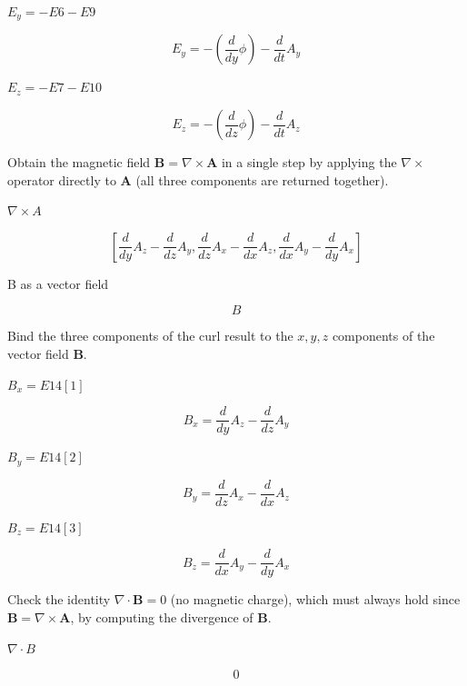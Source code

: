 \documentclass[dvipdfmx]{article}
\begin{document}
$E_y = -E6 - E9$

\begin{equation}
  E_y = -\left(\frac{d}{d y} \phi\right)-\frac{d}{d t} A_{y}
  \label{eq:E12}
\end{equation}

$E_z = -E7 - E10$

\begin{equation}
  E_z = -\left(\frac{d}{d z} \phi\right)-\frac{d}{d t} A_{z}
  \label{eq:E13}
\end{equation}

Obtain the magnetic field $\mathbf B=\nabla\times\mathbf A$ in a single step by applying the $\nabla\times$ operator directly to $\mathbf A$ (all three components are returned together).

$\nabla \times A$

\begin{equation}
  \left[ \frac{d}{d y} A_{z}-\frac{d}{d z} A_{y} , \frac{d}{d z} A_{x}-\frac{d}{d x} A_{z} , \frac{d}{d x} A_{y}-\frac{d}{d y} A_{x} \right]
  \label{eq:E14}
\end{equation}

B as a vector field

\[
  B
\]

Bind the three components of the curl result to the $x,y,z$ components of the vector field $\mathbf B$.

$B_x = E14[1]$

\begin{equation}
  B_x = \frac{d}{d y} A_{z}-\frac{d}{d z} A_{y}
  \label{eq:E15}
\end{equation}

$B_y = E14[2]$

\begin{equation}
  B_y = \frac{d}{d z} A_{x}-\frac{d}{d x} A_{z}
  \label{eq:E16}
\end{equation}

$B_z = E14[3]$

\begin{equation}
  B_z = \frac{d}{d x} A_{y}-\frac{d}{d y} A_{x}
  \label{eq:E17}
\end{equation}

Check the identity $\nabla\cdot\mathbf B=0$ (no magnetic charge), which must always hold since $\mathbf B=\nabla\times\mathbf A$, by computing the divergence of $\mathbf B$.

$\nabla \cdot B$

\begin{equation}
  0
  \label{eq:E18}
\end{equation}
\end{document}
